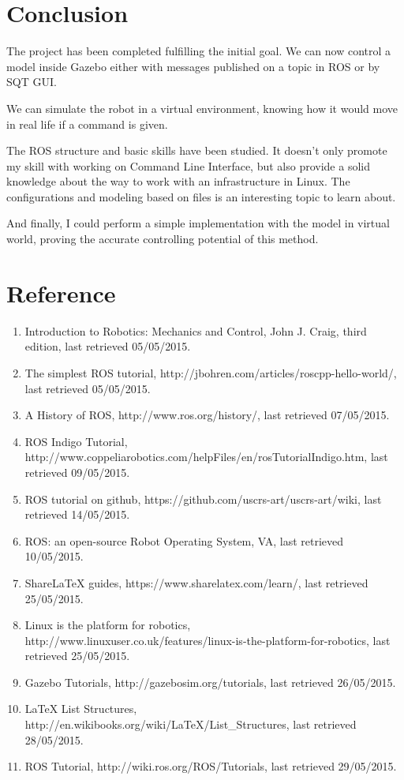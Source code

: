 \documentclass[pdftex,12pt,a4paper]{article}
\begin{document}
  \section{Conclusion}
  The project has been completed fulfilling the initial goal. We can now control a model inside Gazebo either with messages published on a topic in ROS or by SQT GUI.\par
  We can simulate the robot in a virtual environment, knowing how it would move in real life if a command is given.\par
  The ROS structure and basic skills have been studied. It doesn't only promote my skill with working on Command Line Interface, but also provide a solid knowledge about the way to work with an infrastructure in Linux. The configurations and modeling based on files is an interesting topic to learn about.\par
  And finally, I could perform a simple implementation with the model in virtual world, proving the accurate controlling potential of this method.
  
  \newpage
  \section{Reference}
  \begin{enumerate}
  \item Introduction to Robotics: Mechanics and Control, John J. Craig, third edition, last retrieved 05/05/2015.
  \item The simplest ROS tutorial, http://jbohren.com/articles/roscpp-hello-world/, last retrieved 05/05/2015.
  \item A History of ROS, http://www.ros.org/history/, last retrieved 07/05/2015.
  \item ROS Indigo Tutorial, http://www.coppeliarobotics.com/helpFiles/en/rosTutorialIndigo.htm, last retrieved 09/05/2015.
  \item ROS tutorial on github, https://github.com/uscrs-art/uscrs-art/wiki, last retrieved 14/05/2015.
  \item ROS: an open-source Robot Operating System, VA, last retrieved 10/05/2015.
  \item ShareLaTeX guides, https://www.sharelatex.com/learn/, last retrieved 25/05/2015.\
  \item Linux is the platform for robotics, http://www.linuxuser.co.uk/features/linux-is-the-platform-for-robotics, last retrieved 25/05/2015.
  \item Gazebo Tutorials, http://gazebosim.org/tutorials, last retrieved 26/05/2015.
  \item LaTeX List Structures, http://en.wikibooks.org/wiki/LaTeX/List\_Structures, last retrieved 28/05/2015.
  \item ROS Tutorial, http://wiki.ros.org/ROS/Tutorials, last retrieved 29/05/2015.
  \end{enumerate}
  
\end{document}
